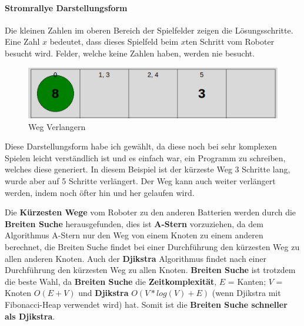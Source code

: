 \documentclass[a4paper,12pt,arial]{scrartcl}
\begin{document}
\paragraph{Stromrallye Darstellungsform}
Die kleinen Zahlen im oberen Bereich der Spielfelder zeigen die Lösungsschritte.
Eine Zahl $x$ bedeutet, dass dieses Spielfeld beim $x$ten Schritt vom Roboter besucht wird.
Felder, welche keine Zahlen haben, werden nie besucht.
\\
\begin{figure}[h]
    \centering
    \includegraphics[height=0.09\textheight]{weg_verlaengern_n.pdf}
    \caption{Weg Verlangern}
    \label{fig:weg_verlangern}
\end{figure}
Diese Darstellungsform habe ich gewählt, da diese noch bei sehr komplexen Spielen leicht verständlich ist und es einfach war, ein Programm zu schreiben, welches diese generiert.
In diesem Beispiel ist der kürzeste Weg 3 Schritte lang, wurde aber auf 5 Schritte verlängert. Der Weg kann auch weiter verlängert werden, indem noch öfter hin und her gelaufen wird.

\par
Die \textbf{Kürzesten Wege} vom Roboter zu den anderen Batterien werden durch die \textbf{Breiten Suche} \cite{cormenBFS} herausgefunden, dies ist \textbf{A-Stern} \cite{hart} vorzuziehen, da dem Algorithmus A-Stern nur den Weg von einem Knoten zu einem anderen berechnet, die Breiten Suche findet bei einer Durchführung den kürzesten Weg zu allen anderen Knoten. Auch der \textbf{Djikstra} \cite{dijkstra} Algorithmus findet nach einer Durchführung den kürzesten Weg zu allen Knoten. \textbf{Breiten Suche} ist trotzdem die beste Wahl, da \textbf{Breiten Suche} die \textbf{Zeitkomplexität}, $E$ = Kanten; $V$ = Knoten $O(E + V)$ und \textbf{Djikstra} $O(V * log(V) + E)$ (wenn Djikstra mit Fibonacci-Heap verwendet wird) hat. Somit ist die \textbf{Breiten Suche schneller als Djikstra}.
\end{document}
